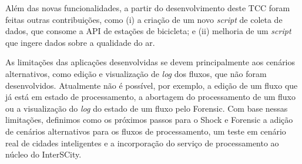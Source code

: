 Além das novas funcionalidades, a partir do desenvolvimento deste TCC foram
feitas outras contribuições, como (i) a criação de um novo \textit{script} de
coleta de dados, que consome a API de estações de bicicleta; e (ii) melhoria 
de um \textit{script} que ingere dados sobre a qualidade do ar.

As limitações das aplicações desenvolvidas se devem principalmente aos cenários
alternativos, como edição e visualização de \textit{log} dos fluxos,
que não foram desenvolvidos. Atualmente não é possível, por exemplo, a edição de
um fluxo que já está em estado de processamento, a abortagem do
processamento de um fluxo ou a visualização do \textit{log} do
estado de um fluxo pelo Forensic. Com base nessas limitações,
definimos como os próximos passos para o Shock e Forensic a adição de cenários
alternativos para os fluxos de processamento, um teste em cenário real de cidades
inteligentes e a incorporação do serviço de processamento ao núcleo do
InterSCity.
